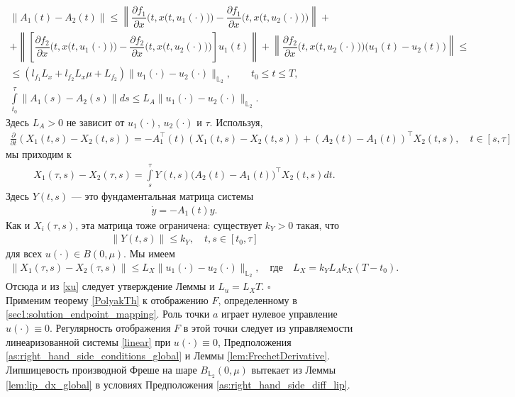 \documentclass[../main.tex]{subfiles}
\begin{document}
	\begin{gather*}
		\| A_1(t) - A_2(t) \| \leqslant 
		\left\| \dfrac{\partial f_1}{\partial x} \Big(t,x\big(t,u_1(\cdot)\big)\Big) - \dfrac{\partial f_1}{\partial x} \Big(t,x\big(t,u_2(\cdot)\big)\Big) \right\| + \\ +
		\left\| \left[ \dfrac{\partial f_2}{\partial x}\Big(t,x\big(t,u_1(\cdot)\big)\Big)  - \dfrac{\partial f_2}{\partial x}\Big(t,x\big(t,u_2(\cdot)\big)\Big) \right] u_1(t) \right\| + 
		\left\| \dfrac{\partial f_2}{\partial x}\Big(t,x\big(t,u_2(\cdot)\big)\Big) \Big(u_1(t) - u_2(t)\Big) \right\| \leqslant \\ \leqslant
		(l_{f_1} L_x  + l_{f_2} L_x \mu   +  L_{f_2} ) \| u_1(\cdot) - u_2(\cdot) \|_{\mathbb{L}_2}, \qquad t_0 \leqslant t \leqslant T,\\
		\int\limits_{t_0}^{\tau} \|A_1(s) - A_2(s) \| ds \leqslant L_A \| u_1(\cdot) - u_2(\cdot) \|_{\mathbb{L}_2}. 
	\end{gather*}
	Здесь $L_A>0$ не зависит от $u_1(\cdot)$, $u_2(\cdot)$ и $\tau$. Используя,
	\begin{gather*}
		\frac{\partial}{\partial t} \left(X_1(t,s) - X_2(t,s) \right) = -A_1^{\top}(t) \left(X_1(t,s) - X_2(t,s) \right) + (A_2(t) - A_1(t))^{\top} X_2(t,s), \quad t \in [s,\tau]
	\end{gather*}
	мы приходим к
	\begin{gather*}
		X_1(\tau,s) - X_2(\tau,s) = \int\limits_s^{\tau} Y(t,s) \big(A_2(t) - A_1(t)\big)^{\top} X_2(t,s) dt.
	\end{gather*}
	Здесь $Y(t,s)$ --- это фундаментальная матрица системы 
	\begin{gather*}
		\dot{y} = -A_1(t) y.
	\end{gather*}
	Как и $X_i(\tau,s)$, эта матрица тоже ограничена: существует $k_Y>0$ такая, что
	\begin{gather*}
		\|Y(t,s)\| \leqslant k_Y, \quad t,s \in [t_0, \tau]
	\end{gather*}
	для всех $u(\cdot) \in B(0,\mu)$. Мы имеем
	\begin{gather*}
		\| X_1(\tau,s) - X_2(\tau,s) \| \leqslant L_X \| u_1(\cdot) - u_2(\cdot) \|_{\mathbb{L}_2}, \quad \mbox{где} \quad L_X = k_Y L_A k_X (T - t_0) .
	\end{gather*}
	Отсюда и из \eqref{xu} следует утверждение Леммы и $L_u = L_X T$.
	\hfill$\square$\\[1ex]%
	
	Применим теорему \ref{PolyakTh} к отображению $F$, определенному в \eqref{sec1:solution_endpoint_mapping}. Роль точки $a$ играет нулевое управление $u(\cdot) \equiv 0$. Регулярность отображения  $F$ в этой точки следует из управляемости линеаризованной системы \eqref{linear} при $u(\cdot) \equiv 0$, Предположения  \ref{as:right_hand_side_conditions_global} и Леммы \ref{lem:FrechetDerivative}. Липшицевость производной Фреше на шаре $B_{\mathbb{L}_2}(0,\mu)$ вытекает из Леммы \ref{lem:lip_dx_global} в условиях Предположения \ref{as:right_hand_side_diff_lip}. 
	
\end{document}
